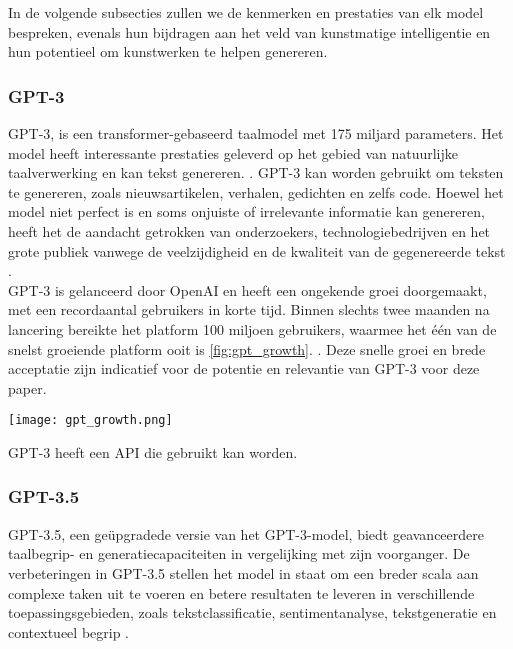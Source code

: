 In de volgende subsecties zullen we de kenmerken en prestaties van elk model bespreken, evenals hun bijdragen aan het veld van kunstmatige intelligentie en hun potentieel om kunstwerken te helpen genereren. \\

\subsubsection{GPT-3}
GPT-3, is een transformer-gebaseerd taalmodel met 175 miljard parameters. Het model heeft interessante prestaties geleverd op het gebied van natuurlijke taalverwerking en kan tekst genereren. \autocite{nytimes_gpt3}. GPT-3 kan worden gebruikt om teksten te genereren, zoals nieuwsartikelen, verhalen, gedichten en zelfs code. Hoewel het model niet perfect is en soms onjuiste of irrelevante informatie kan genereren, heeft het de aandacht getrokken van onderzoekers, technologiebedrijven en het grote publiek vanwege de veelzijdigheid en de kwaliteit van de gegenereerde tekst \autocite{wiki_gpt3}. \\

GPT-3 is gelanceerd door OpenAI en heeft een ongekende groei doorgemaakt, met een recordaantal gebruikers in korte tijd. Binnen slechts twee maanden na lancering bereikte het platform 100 miljoen gebruikers, waarmee het één van de snelst groeiende platform ooit is \ref{fig:gpt_growth}. \autocite{reuters_chatgpt}. Deze snelle groei en brede acceptatie zijn indicatief voor de potentie en relevantie van GPT-3 voor deze paper.\\

\begin{center}
    \texttt{[image: gpt\_growth.png]}
    \label{fig:gpt_growth}
\end{center}

GPT-3 heeft een API die gebruikt kan worden.

\subsubsection{GPT-3.5}
GPT-3.5, een geüpgradede versie van het GPT-3-model, biedt geavanceerdere taalbegrip- en generatiecapaciteiten in vergelijking met zijn voorganger. De verbeteringen in GPT-3.5 stellen het model in staat om een breder scala aan complexe taken uit te voeren en betere resultaten te leveren in verschillende toepassingsgebieden, zoals tekstclassificatie, sentimentanalyse, tekstgeneratie en contextueel begrip \autocite{gpt_nappier, gpt_cn}. \\

